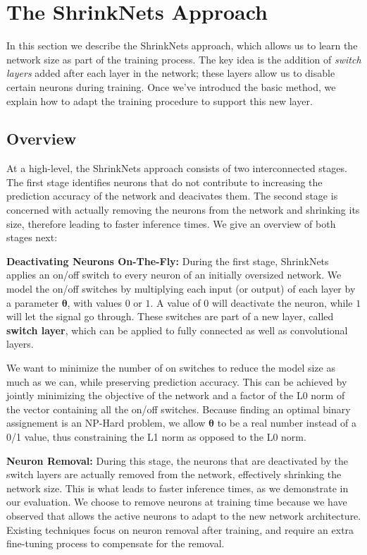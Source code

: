 
\section{The ShrinkNets Approach}

In this section we describe the ShrinkNets approach, which allows us to learn
the network size as part of the training process. The key idea is the addition
of \emph{switch layers} added after each layer in the network;  these layers
allow us to disable certain neurons during training.  Once we've introducd the
basic method, we explain how to adapt the training procedure to support this new
layer. 

\subsection{Overview}

At a high-level, the ShrinkNets approach consists of two interconnected stages.
The first stage identifies neurons that do not contribute to increasing the
prediction accuracy of the network and deacivates them. The second stage is
concerned with actually removing the neurons from the network and shrinking its
size, therefore leading to faster inference times. We give an overview of both
stages next:

\noindent\textbf{Deactivating Neurons On-The-Fly: }During the first stage,
ShrinkNets applies an on/off switch to every neuron of an initially oversized
network. We model the on/off switches by multiplying each input (or output) of
each layer by a parameter $\bm{\theta}$, with values $0$ or $1$. A value of $0$
will deactivate the neuron, while $1$ will let the signal go through. These
switches are part of a new layer, called \textbf{switch layer}, which can
be applied to fully connected as well as convolutional layers.

We want to minimize the number of on switches to reduce the model size as much
as we can, while preserving prediction accuracy. This can be achieved by jointly
minimizing the objective of the network and a factor of the L0 norm of the
vector containing all the on/off switches. Because finding an optimal binary
assignement is an NP-Hard problem, we allow $\bm{\theta}$ to be a real number
instead of a 0/1 value, thus constraining the L1 norm as opposed to the L0 norm.

\noindent\textbf{Neuron Removal: } During this stage, the neurons that are
deactivated by the switch layers are actually removed from the network,
effectively shrinking the network size. This is what leads to faster inference
times, as we demonstrate in our evaluation. We choose to remove neurons at
training time because we have observed that allows the active neurons to adapt
to the new network architecture. Existing techniques focus on neuron removal
after training, and require an extra fine-tuning process to compensate for the
removal.


